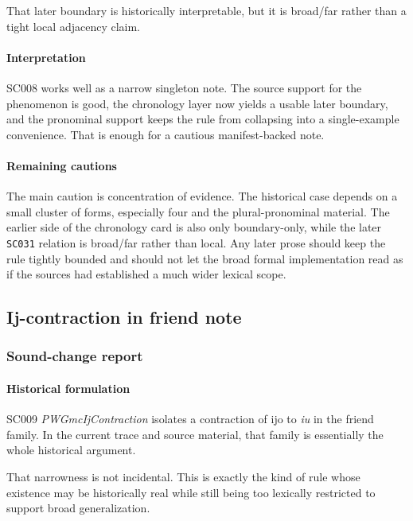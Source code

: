 \documentclass[
  british,
  a4paper,
]{article}
\begin{document}
That later boundary is historically interpretable, but it is broad/far
rather than a tight local adjacency claim.

\paragraph{Interpretation}\label{interpretation-5}

SC008 works well as a narrow singleton note. The source support for the
phenomenon is good, the chronology layer now yields a usable later
boundary, and the pronominal support keeps the rule from collapsing into
a single-example convenience. That is enough for a cautious
manifest-backed note.

\paragraph{Remaining cautions}\label{remaining-cautions-5}

The main caution is concentration of evidence. The historical case
depends on a small cluster of forms, especially four and the
plural-pronominal material. The earlier side of the chronology card is
also only boundary-only, while the later \texttt{SC031} relation is
broad/far rather than local. Any later prose should keep the rule
tightly bounded and should not let the broad formal implementation read
as if the sources had established a much wider lexical scope.

\subsection{Ij-contraction in friend
note}\label{ij-contraction-in-friend-note}

\subsubsection{Sound-change report}\label{sound-change-report-6}

\paragraph{Historical formulation}\label{historical-formulation-6}

SC009 \emph{PWGmcIjContraction} isolates a contraction of ijo to
\emph{iu} in the friend family. In the current trace and source
material, that family is essentially the whole historical argument.

That narrowness is not incidental. This is exactly the kind of rule
whose existence may be historically real while still being too lexically
restricted to support broad generalization.
\end{document}
